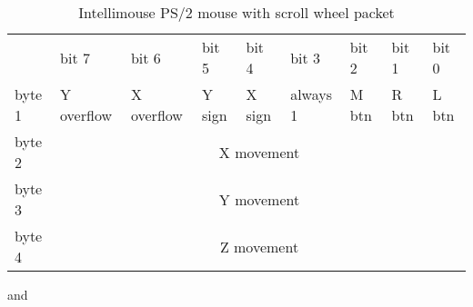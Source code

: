 \begin{table}[H]
    \begin{tabular}{lllllllll}
        & bit 7 & bit 6 & bit 5 & bit 4 & bit 3 & bit 2 & bit 1 & bit 0 \\

        \cline{2-9} 

        \multicolumn{1}{l|}{byte 1}        & \multicolumn{1}{l|}{Y overflow}   &
        \multicolumn{1}{l|}{X overflow}    & \multicolumn{1}{l|}{Y sign}       &
        \multicolumn{1}{l|}{X sign}        & \multicolumn{1}{l|}{always 1}     &
        \multicolumn{1}{l|}{M btn} & \multicolumn{1}{l|}{R btn} &
        \multicolumn{1}{l|}{L btn} \\

        \cline{2-9} 

        \multicolumn{1}{l|}{byte 2} & \multicolumn{8}{c|}{X movement} \\

        \cline{2-9} 

        \multicolumn{1}{l|}{byte 3} & \multicolumn{8}{c|}{Y movement} \\

        \cline{2-9} 

        \multicolumn{1}{l|}{byte 4} & \multicolumn{8}{c|}{Z movement} \\

        \cline{2-9} 
    \end{tabular}
    \caption{Intellimouse PS/2 mouse with scroll wheel packet \cite{ps2interface}}
    \label{table:imps2scroll}
\end{table}

\noindent
and


